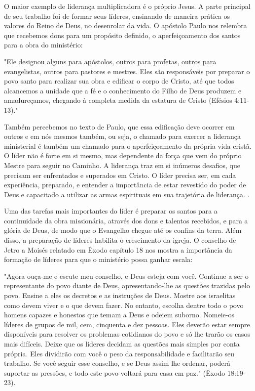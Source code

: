 \documentclass[12pt]{abntex2}
\begin{document}
O maior exemplo de liderança multiplicadora é o próprio Jesus. A parte principal de seu trabalho foi de formar seus líderes, ensinando de maneira prática os valores do Reino de Deus, no desenrolar da vida. O apóstolo Paulo nos relembra que recebemos dons para um propósito definido, o aperfeiçoamento dos santos para a obra do ministério: 

\begin{citacao}"Ele designou alguns para apóstolos, outros para profetas, outros para evangelistas, outros para pastores e mestres. Eles são responsáveis por preparar o povo santo para realizar sua obra e edificar o corpo de Cristo, até que todos alcancemos a unidade que a fé e o conhecimento do Filho de Deus produzem e amadureçamos, chegando à completa medida da estatura de Cristo (Efésios 4:11-13)."\end{citacao}

Também percebemos no texto de Paulo, que essa edificação deve ocorrer em outros e em nós mesmos também, ou seja, o chamado para exercer a liderança ministerial é também um chamado para o aperfeiçoamento da própria vida cristã. O líder não é forte em si mesmo, mas dependente da força que vem do próprio Mestre para seguir no Caminho\cite[p. 130,131]{brandao}. A liderança traz em si inúmeros desafios, que precisam ser enfrentados e superados em Cristo. O líder precisa ser, em cada experiência, preparado, e entender a importância de estar revestido do poder de Deus e capacitado a utilizar as armas espirituais em sua trajetória de liderança. \cite[p. 132]{brandao}.

Uma das tarefas mais importantes do líder é preparar os santos para a continuidade da obra missionária, através dos dons e talentos recebidos, e para a glória de Deus, de modo que o Evangelho chegue até os confins da terra. Além disso, a preparação de líderes habilita o crescimento da igreja. O conselho de Jetro a Moisés relatado em Êxodo capítulo 18 nos mostra a importância da formação de líderes para que o ministério possa ganhar escala: 

\begin{citacao}"Agora ouça-me e escute meu conselho, e Deus esteja com você. Continue a ser o representante do povo diante de Deus, apresentando-lhe as questões trazidas pelo povo. Ensine a eles os decretos e as instruções de Deus. Mostre aos israelitas como devem viver e o que devem fazer. No entanto, escolha dentre todo o povo homens capazes e honestos que temam a Deus e odeiem suborno. Nomeie-os líderes de grupos de mil, cem, cinquenta e dez pessoas. Eles deverão estar sempre disponíveis para resolver os problemas cotidianos do povo e só lhe trarão os casos mais difíceis. Deixe que os líderes decidam as questões mais simples por conta própria. Eles dividirão com você o peso da responsabilidade e facilitarão seu trabalho. Se você seguir esse conselho, e se Deus assim lhe ordenar, poderá suportar as pressões, e todo este povo voltará para casa em paz." (Êxodo 18:19-23).\end{citacao}
\end{document}
